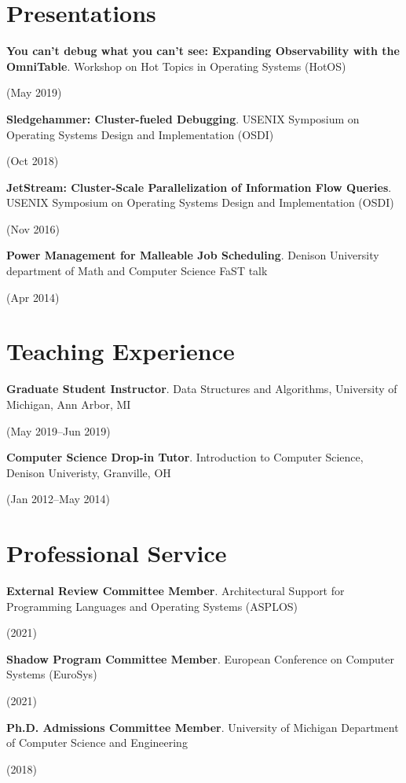 \documentclass[letterpaper,10pt]{article}
\newcommand{\sidebyside}[2]{
  \begin{minipage}[t]{.75\textwidth}
    \raggedright{}
    #2
  \end{minipage}
  \hspace{.01\textwidth}
    \begin{minipage}[t]{.205\textwidth}
    \raggedleft
    #1
  \end{minipage}
}
\newcommand{\trio}[3]{\sidebyside{#3}{\textbf{#1}. #2}}
\begin{document}
\section{Presentations}
\begin{smenumerate}
\item\trio{You can't debug what you can't see: Expanding Observability with the
  OmniTable}{Workshop on Hot Topics in Operating Systems (HotOS)}{(May 2019)}

\item\trio{Sledgehammer: Cluster-fueled Debugging}{USENIX Symposium on Operating
  Systems Design and Implementation (OSDI)}{(Oct 2018)}

\item\trio{JetStream: Cluster-Scale Parallelization of Information Flow
  Queries}{USENIX Symposium on Operating Systems Design and Implementation
  (OSDI)}{(Nov 2016)}

\item\trio{Power Management for Malleable Job Scheduling}{Denison University
  department of Math and Computer Science FaST talk}{(Apr 2014)}
\end{smenumerate}

\section{Teaching Experience}
\begin{smenumerate}
\item\trio{Graduate Student Instructor}{Data Structures and Algorithms,
  University of Michigan, Ann Arbor, MI}{(May 2019--Jun 2019)}

\item\trio{Computer Science Drop-in Tutor}{Introduction to Computer Science,
  Denison Univeristy, Granville, OH}{(Jan 2012--May 2014)}
\end{smenumerate}

\section{Professional Service}
\begin{smenumerate}
\item\trio{External Review Committee Member}{Architectural Support for
  Programming Languages and Operating Systems (ASPLOS)}{(2021)}

\item\trio{Shadow Program Committee Member}{European Conference on Computer
  Systems (EuroSys)}{(2021)}

\item\trio{Ph.D. Admissions Committee Member}{University of Michigan Department
  of Computer Science and Engineering}{(2018)}
\end{smenumerate}
\end{document}
